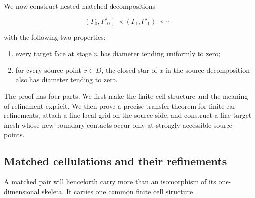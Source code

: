 \documentclass[11pt]{article}
\theoremstyle{mainplain}
\theoremstyle{mainroman}
\theoremstyle{definition}
\providecommand{\tightlist}{\setlength{\itemsep}{0pt}\setlength{\parskip}{0pt}}
\numberwithin{equation}{section}
\begin{document}
We now construct nested matched decompositions

\[
(\Gamma_0,\Gamma'_0)
 \prec
(\Gamma_1,\Gamma'_1)
 \prec\cdots
\]

with the following two properties:

\begin{enumerate}
\def\labelenumi{\arabic{enumi}.}
\tightlist
\item
  every target face at stage \(n\) has diameter tending uniformly to zero;
\item
  for every source point \(x\in D\), the closed star of \(x\) in the source decomposition also has diameter tending to zero.
\end{enumerate}

The proof has four parts. We first make the finite cell structure and the meaning of refinement explicit. We then prove a precise transfer theorem for finite ear refinements, attach a fine local grid on the source side, and construct a fine target mesh whose new boundary contacts occur only at strongly accessible source points.

\subsection{Matched cellulations and their refinements}\label{matched-cellulations-and-their-refinements}

A matched pair will henceforth carry more than an isomorphism of its one-dimensional skeleta. It carries one common finite cell structure.
\end{document}
